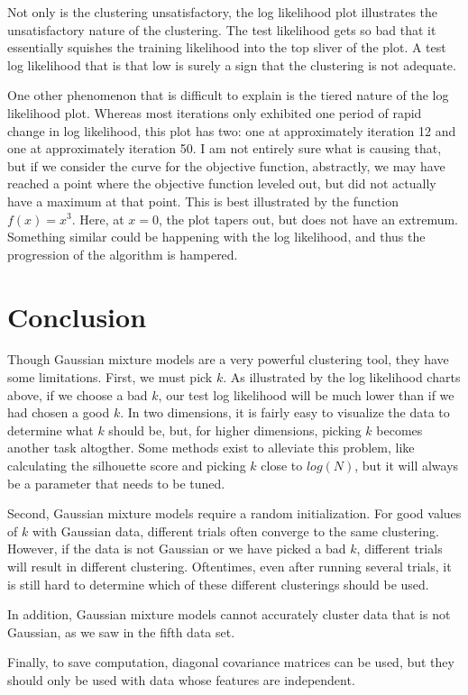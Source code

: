 \documentclass{article}
\begin{document}
Not only is the clustering unsatisfactory, the log likelihood plot illustrates 
the unsatisfactory nature of the clustering. The test likelihood gets so bad 
that it essentially squishes the training likelihood into the top sliver of the 
plot. A test log likelihood that is that low is surely a sign that the 
clustering is not adequate.

One other phenomenon that is difficult to explain is the tiered nature of the 
log likelihood plot. Whereas most iterations only exhibited one period of 
rapid change in log likelihood, this plot has two: one at approximately 
iteration 12 and one at approximately iteration 50. I am not entirely sure what 
is causing that, but if we consider the curve for the objective function, 
abstractly, we may have reached a point where the objective function leveled 
out, but did not actually have a maximum at that point. This is best illustrated 
by the function $f(x) = x^3$. Here, at $x = 0$, the plot tapers out, but does 
not have an extremum. Something similar could be happening with the log 
likelihood, and thus the progression of the algorithm is hampered.

\section{Conclusion}

Though Gaussian mixture models are a very powerful clustering tool, they have 
some limitations. First, we must pick $k$. As illustrated by the log likelihood 
charts above, if we choose a bad $k$, our test log likelihood will be much lower 
than if we had chosen a good $k$. In two dimensions, it is fairly easy to 
visualize the data to determine what $k$ should be, but, for higher dimensions, 
picking $k$ becomes another task altogther. Some methods exist to alleviate this 
problem, like calculating the silhouette score and picking $k$ close to $log(N)$, 
but it will always be a parameter that needs to be tuned.

Second, Gaussian mixture models require a random initialization. For good values 
of $k$ with Gaussian data, different trials often converge to the same clustering. 
However, if the data is not Gaussian or we have picked a bad $k$, different 
trials will result in different clustering. Oftentimes, even after running 
several trials, it is still hard to determine which of these different 
clusterings should be used.

In addition, Gaussian mixture models cannot accurately cluster data that is not 
Gaussian, as we saw in the fifth data set.

Finally, to save computation, 
diagonal covariance matrices can be used, but they should only be used with 
data whose features are independent.
\end{document}
